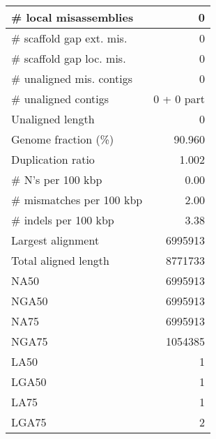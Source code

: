 \documentclass[12pt,a4paper]{article}
\begin{document}
\begin{table}[ht]
\begin{center}
\begin{tabular}{|l*{1}{|r}|}
\# local misassemblies & 0 \\ \hline
\# scaffold gap ext. mis. & 0 \\ \hline
\# scaffold gap loc. mis. & 0 \\ \hline
\# unaligned mis. contigs & 0 \\ \hline
\# unaligned contigs & 0 + 0 part \\ \hline
Unaligned length & 0 \\ \hline
Genome fraction (\%) & 90.960 \\ \hline
Duplication ratio & 1.002 \\ \hline
\# N's per 100 kbp & 0.00 \\ \hline
\# mismatches per 100 kbp & 2.00 \\ \hline
\# indels per 100 kbp & 3.38 \\ \hline
Largest alignment & 6995913 \\ \hline
Total aligned length & 8771733 \\ \hline
NA50 & 6995913 \\ \hline
NGA50 & 6995913 \\ \hline
NA75 & 6995913 \\ \hline
NGA75 & 1054385 \\ \hline
LA50 & 1 \\ \hline
LGA50 & 1 \\ \hline
LA75 & 1 \\ \hline
LGA75 & 2 \\ \hline
\end{tabular}
\end{center}
\end{table}
\end{document}
